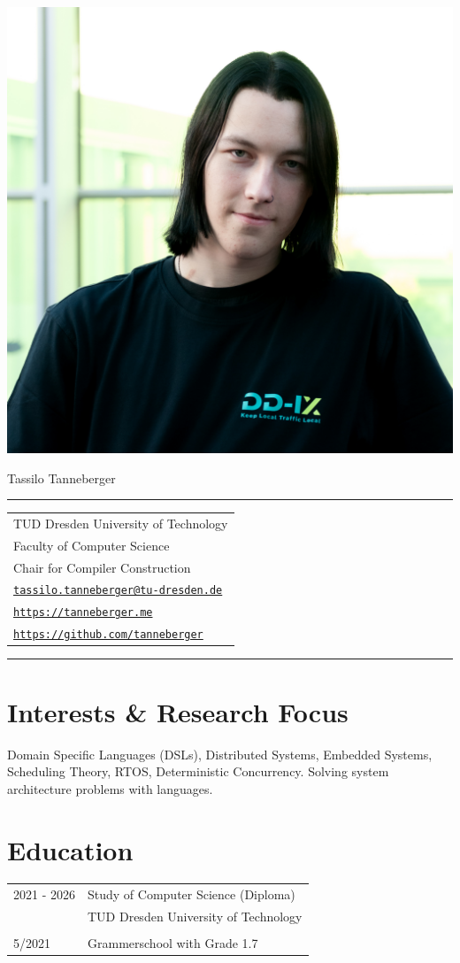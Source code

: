 \documentclass[11pt, a4paper, oneside]{report}
\begin{document}
\includegraphics[width=0.3\linewidth, right]{Tassilo} 
\vspace*{-15em}
\begin{flushleft}
\hspace*{1.3em} \huge Tassilo Tanneberger
\vspace*{-0.5em}
\par\noindent\rule{0.6\textwidth}{0.4pt}
\end{flushleft}

\vspace*{-0.4em}

\begin{tabular}{l}
TUD Dresden University of Technology  \\
Faculty of Computer Science \\ 
Chair for Compiler Construction \\ 
\href{mailto: tassilo.tanneberger@tu-dresden.de}{\texttt{tassilo.tanneberger@tu-dresden.de}} \\
\href{https://tanneberger.me}{\texttt{https://tanneberger.me}} \\
\href{https://github.com/tanneberger}{\texttt{https://github.com/tanneberger}}
\end{tabular}

\par\noindent\rule{0.6\textwidth}{0.4pt}

\section*{Interests \& Research Focus}

Domain Specific Languages (DSLs), Distributed Systems, Embedded Systems, Scheduling Theory, RTOS, Deterministic Concurrency. 
Solving system architecture problems with languages.

\section*{Education}

\begin{tabular}{ R{3cm} L{10cm}}
	2021 - 2026 &  Study of Computer Science (Diploma) \\
							& TUD Dresden University of Technology \\ 
							&			\\
	5/2021			& Grammerschool with Grade 1.7
\end{tabular}
\end{document}
